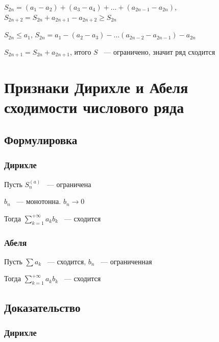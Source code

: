 \documentclass{article}
\begin{document}
            $S_{2n} = (a_1 - a_2) + (a_3 - a_4) + \ldots + (a_{2n - 1} - a_{2n})$, $S_{2n + 2} = S_{2n} + a_{2n + 1} - a_{2n + 2} \geq S_{2n}$
            
            $S_{2n} \leq a_1$, $S_{2n} = a_1 - (a_2 - a_3) - \ldots (a_{2n - 2} - a_{2n - 1}) - a_{2n}$
            
            $S_{2n + 1} = S_{2n} + a_{2n + 1}$, итого $S$ ~--- ограничено, значит ряд сходится
            
    \newpage
    
    \section{Признаки Дирихле и Абеля сходимости числового ряда}
    
        \subsection{Формулировка}
        
            \subsubsection{Дирихле}
            
                Пусть $S^{(a)}_n$ ~--- ограничена
                
                $b_n$ ~--- монотонна. $b_n \rightarrow 0$
                
                Тогда $\sum\limits^{+\infty}_{k = 1} a_k b_k$ ~--- сходится
                
            \subsubsection{Абеля}
            
                Пусть $\sum a_k$ ~--- сходится, $b_n$ ~--- ограниченная
                
                Тогда $\sum\limits^{+\infty}_{k = 1} a_k b_k$ ~--- сходится 
                
        \subsection{Доказательство}
        
            \subsubsection{Дирихле}
            
\end{document}
